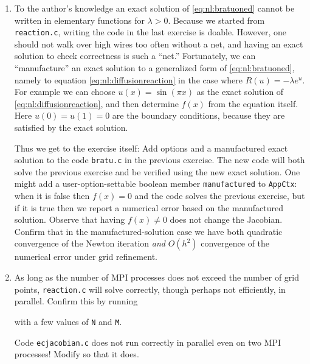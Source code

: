\begin{enumerate}
\item To the author's knowledge an exact solution of \eqref{eq:nl:bratuoned} cannot be written in elementary functions for $\lambda>0$.  Because we started from \texttt{reaction.c}, writing the code in the last exercise is doable.  However, one should not walk over high wires too often without a net, and having an exact solution to check correctness is such a ``net.''  Fortunately, we can ``manufacture'' \citep{Wesseling2001} an exact solution to a generalized form of \eqref{eq:nl:bratuoned}, namely to equation \eqref{eq:nl:diffusionreaction} in the case where $R(u)=-\lambda e^u$.  For example we can choose $u(x) = \sin(\pi x)$ as the exact solution of \eqref{eq:nl:diffusionreaction}, and then determine $f(x)$ from the equation itself.  Here $u(0)=u(1)=0$ are the boundary conditions, because they are satisfied by the exact solution.

Thus we get to the exercise itself: Add options and a manufactured exact solution to the code \texttt{bratu.c} in the previous exercise.  The new code will both solve the previous exercise and be verified using the new exact solution.  One might add a user-option-settable boolean member \texttt{manufactured} to \texttt{AppCtx}: when it is false then $f(x)=0$ and the code solves the previous exercise, but if it is true then we report a numerical error based on the manufactured solution.  Observe that having $f(x)\ne 0$ does not change the Jacobian.  Confirm that in the manufactured-solution case we have both quadratic convergence of the Newton iteration \emph{and} $O(h^2)$ convergence of the numerical error under grid refinement.

\item As long as the number of MPI processes does not exceed the number of grid points, \texttt{reaction.c} will solve correctly, though perhaps not efficiently, in parallel.  Confirm this by running
with a few values of \texttt{N} and \texttt{M}.

Code \texttt{ecjacobian.c} does not run correctly in parallel even on two MPI processes!  Modify so that it does.

\end{enumerate}
